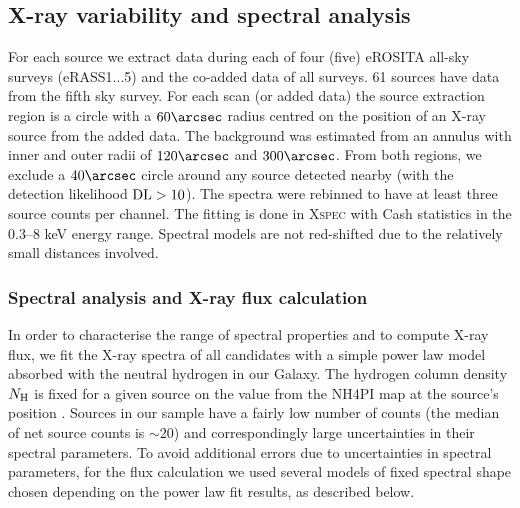 \documentclass[fleqn,usenatbib]{mnras}
\begin{document}
\subsection{X-ray variability and spectral analysis}
\label{sect:catalog:xray}
For each source we extract data during each of four (five) eROSITA all-sky surveys (eRASS1...5) and the co-added data of all surveys. 61 sources have data from the fifth sky survey. For each scan (or added data) the source extraction region is a circle with a $60\arcsec$ radius centred on the position of an X-ray source from the added data. The background was estimated from an annulus with inner and outer radii of $120\arcsec$ and $300\arcsec$. From both regions, we exclude a $40\arcsec$ circle around any source detected nearby (with the detection likelihood ${\rm DL}>10$). The spectra were rebinned to have at least three source counts per channel.  The fitting is done in \textsc{Xspec} \citep{Arnaud1996} with Cash statistics \citep{Cash1979} in the 0.3--8 keV energy range. Spectral models are not red-shifted due to the relatively small distances involved.



\subsubsection{Spectral analysis and X-ray flux calculation}

In order to characterise the range of spectral properties and to compute X-ray flux, we fit the X-ray spectra of all candidates with a simple power law model absorbed with the neutral hydrogen in our Galaxy. The hydrogen column density $N_{\rm H}$ is fixed for a given source on the value from the NH4PI map at the source's position \citep{HI4PICollaboration2016}. Sources in our sample have a fairly low number of counts (the median of net source counts is $\sim20$) and correspondingly large uncertainties in their spectral parameters. To avoid additional errors due to uncertainties in spectral parameters, for the flux calculation we used several  models of fixed spectral shape chosen depending on the power law fit results, as described below. 
\end{document}
